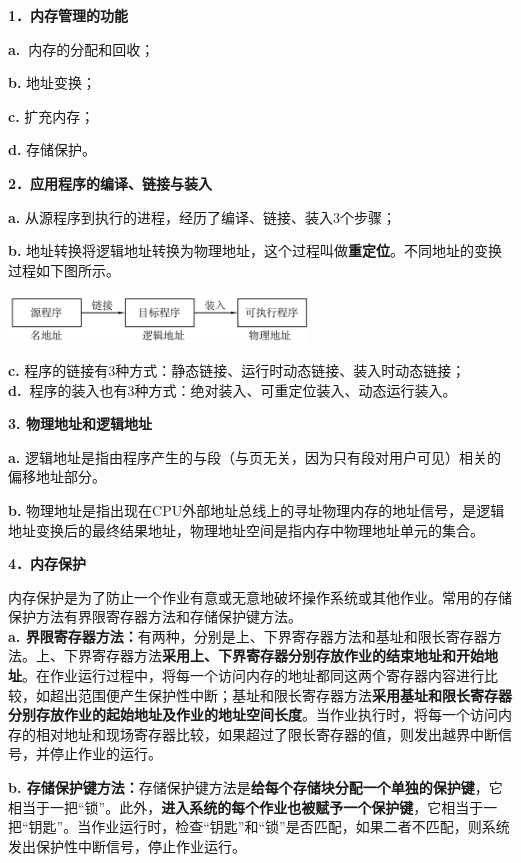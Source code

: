\textbf{{1．内存管理的功能}}

\textbf{a.~}{内存的分配和回收；}

\textbf{b.} 地址变换；

\textbf{c.} 扩充内存；

\textbf{d.} 存储保护。

\textbf{{2．应用程序的编译、链接与装入}}

\textbf{a.} {从源程序到执行的进程，经历了编译、链接、装入3个步骤；}

\textbf{b.}
地址转换将逻辑地址转换为物理地址，这个过程叫做\textbf{重定位}。不同地址的变换过程如下图所示。

\includegraphics[width=3.12500in,height=0.50000in]{png-jpeg-pics/0862581A20AADD62F49C0B16737DE24C.png}

\textbf{c.}
程序的链接有3种方式：静态链接、运行时动态链接、装入时动态链接；\\
\textbf{d.~}程序的装入也有3种方式：绝对装入、可重定位装入、动态运行装入。

{\textbf{3. 物理地址和逻辑地址}}

\textbf{a.}
{逻辑地址是指由程序产生的与段（与页无关，因为只有段对用户可见）相关的偏移地址部分。}

\textbf{b.}
物理地址是指出现在CPU外部地址总线上的寻址物理内存的地址信号，是逻辑地址变换后的最终结果地址，物理地址空间是指内存中物理地址单元的集合。

\textbf{{4．内存保护}}

内存保护是为了防止一个作业有意或无意地破坏操作系统或其他作业。常用的存储保护方法有界限寄存器方法和存储保护键方法。\\
\textbf{a.
界限寄存器方法：}有两种，分别是上、下界寄存器方法和基址和限长寄存器方法。上、下界寄存器方法\textbf{{采用上、下界寄存器分别存放作业的结束地址和开始地址}}。在作业运行过程中，将每一个访问内存的地址都同这两个寄存器内容进行比较，如超出范围便产生保护性中断；{基址和限长寄存器方法}{\textbf{采用基}}{\textbf{{址和限长寄存器分别存放作业的起始地址及作业的地址空间长度}}。当作业执行时，将每一个访问内存的相对地址和现场寄存器比较，如果超过了限长寄存器的值，则发出越界中断信号，并停止作业的运行。}

\textbf{b.
存储保护键方法：}存储保护键方法是\textbf{给每个存储块分配一个单独的保护键}，它相当于一把``锁''。此外，\textbf{进入系统的每个作业也被赋予一个保护键}，它相当于一把``钥匙''。当作业运行时，检查``钥匙''和``锁''是否匹配，如果二者不匹配，则系统发出保护性中断信号，停止作业运行。
